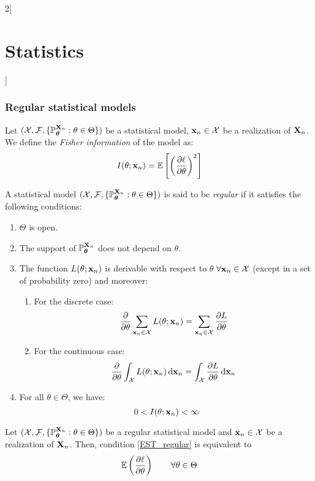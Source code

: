 \documentclass[../../../main.tex]{subfiles}
\begin{document}
\begin{multicols}{2}[\section{Statistics}]
  \subsubsection{Regular statistical models}
  \begin{definition}
    Let $(\mathcal{X},\mathcal{F},\{\mathbb{P}_{\boldsymbol{\mathrm{\theta}}}^{\boldsymbol{\mathrm{X}}_n}:\theta\in\Theta\})$ be a statistical model, $\boldsymbol{\mathrm{x}}_n\in\mathcal{X}$ be a realization of $\boldsymbol{\mathrm{X}}_n$. We define the \emph{Fisher information} of the model as: $$I(\theta;\boldsymbol{\mathrm{x}}_n)=\mathbb{E}\left[{\left(\pdv{\ell}{\theta}(\theta;\boldsymbol{\mathrm{x}}_n)\right)}^2\right]$$
  \end{definition}
  \begin{definition}
    A statistical model $(\mathcal{X},\mathcal{F},\{\mathbb{P}_{\boldsymbol{\mathrm{\theta}}}^{\boldsymbol{\mathrm{X}}_n}:\theta\in\Theta\})$ is said to be \emph{regular} if it satisfies the following conditions:
    \begin{enumerate}
      \item $\Theta$ is open.
      \item The support of $\mathbb{P}_{\boldsymbol{\mathrm{\theta}}}^{\boldsymbol{\mathrm{X}}_n}$ does not depend on $\theta$.
      \item The function $L(\theta;\boldsymbol{\mathrm{x}}_n)$ is derivable with respect to $\theta$ $\forall \boldsymbol{\mathrm{x}}_n\in\mathcal{X}$ (except in a set of probability zero) and moreover:
            \begin{enumerate}
              \item For the discrete case: $$\pdv{}{\theta}\sum_{\boldsymbol{\mathrm{x}}_n\in\mathcal{X}}L(\theta;\boldsymbol{\mathrm{x}}_n)=\sum_{\boldsymbol{\mathrm{x}}_n\in\mathcal{X}}\pdv{L}{\theta}(\theta;\boldsymbol{\mathrm{x}}_n)$$
              \item\label{EST_regular} For the continuous case: $$\pdv{}{\theta}\int_{\mathcal{X}}L(\theta;\boldsymbol{\mathrm{x}}_n)\dd{\boldsymbol{\mathrm{x}}_n}=\int_{\mathcal{X}}\pdv{L}{\theta}(\theta;\boldsymbol{\mathrm{x}}_n)\dd{\boldsymbol{\mathrm{x}}_n}$$
            \end{enumerate}
      \item For all $\theta\in\Theta$, we have: $$0<I(\theta;\boldsymbol{\mathrm{x}}_n)<\infty$$
    \end{enumerate}
  \end{definition}
  \begin{proposition}
    Let $(\mathcal{X},\mathcal{F},\{\mathbb{P}_{\boldsymbol{\mathrm{\theta}}}^{\boldsymbol{\mathrm{X}}_n}:\theta\in\Theta\})$ be a regular statistical model and $\boldsymbol{\mathrm{x}}_n\in\mathcal{X}$ be a realization of $\boldsymbol{\mathrm{X}}_n$. Then, condition \cref{EST_regular} is equivalent to $$\mathbb{E}\left(\pdv{\ell}{\theta}(\theta;\boldsymbol{\mathrm{x}}_n)\right)\qquad\forall \theta\in\Theta$$
  \end{proposition}

\end{multicols}
\end{document}
